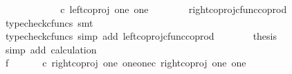 \begin{isabellebody}
\ \ \ \ \isamarkupfalse%
\ \isamarkupfalse%
\ {\isachardoublequoteopen}{\isachardot}{\kern0pt}{\isachardot}{\kern0pt}{\isachardot}{\kern0pt}\ {\isacharequal}{\kern0pt}\ {\isasymlangle}{\isasymt}{\isacharcomma}{\kern0pt}{\isasymf}{\isasymrangle}\ {\isasymamalg}\ {\isasymlangle}{\isasymf}{\isacharcomma}{\kern0pt}{\isasymt}{\isasymrangle}\ {\isasymcirc}\isactrlsub c\ left{\isacharunderscore}{\kern0pt}coproj\ one\ one{\isachardoublequoteclose}\isanewline
\ \ \ \ \ \ \isamarkupfalse%
\ right{\isacharunderscore}{\kern0pt}coproj{\isacharunderscore}{\kern0pt}cfunc{\isacharunderscore}{\kern0pt}coprod\ \isamarkupfalse%
\ {\isacharparenleft}{\kern0pt}typecheck{\isacharunderscore}{\kern0pt}cfuncs{\isacharcomma}{\kern0pt}\ smt{\isacharparenright}{\kern0pt}\isanewline
\ \ \ \ \isamarkupfalse%
\ \isamarkupfalse%
\ {\isachardoublequoteopen}{\isachardot}{\kern0pt}{\isachardot}{\kern0pt}{\isachardot}{\kern0pt}\ {\isacharequal}{\kern0pt}\ {\isasymlangle}{\isasymt}{\isacharcomma}{\kern0pt}{\isasymf}{\isasymrangle}{\isachardoublequoteclose}\isanewline
\ \ \ \ \ \ \isamarkupfalse%
\ {\isacharparenleft}{\kern0pt}typecheck{\isacharunderscore}{\kern0pt}cfuncs{\isacharcomma}{\kern0pt}\ simp\ add{\isacharcolon}{\kern0pt}\ left{\isacharunderscore}{\kern0pt}coproj{\isacharunderscore}{\kern0pt}cfunc{\isacharunderscore}{\kern0pt}coprod{\isacharparenright}{\kern0pt}\isanewline
\ \ \ \ \isamarkupfalse%
\ \isamarkupfalse%
\ {\isacharquery}{\kern0pt}thesis\isanewline
\ \ \ \ \ \ \isamarkupfalse%
\ {\isacharparenleft}{\kern0pt}simp\ add{\isacharcolon}{\kern0pt}\ calculation{\isacharparenright}{\kern0pt}\isanewline
\ \ \isamarkupfalse%
\isanewline
\ \ \isamarkupfalse%
\ f{}{\isacharcolon}{\kern0pt}\ {\isachardoublequoteopen}{\isasymlangle}{\isasymf}{\isacharcomma}{\kern0pt}\ {\isasymf}{\isasymrangle}\ {\isasymamalg}\ {\isasymlangle}{\isasymt}{\isacharcomma}{\kern0pt}{\isasymf}{\isasymrangle}\ {\isasymamalg}\ {\isasymlangle}{\isasymf}{\isacharcomma}{\kern0pt}{\isasymt}{\isasymrangle}\ {\isasymcirc}\isactrlsub c\ {\isacharparenleft}{\kern0pt}right{\isacharunderscore}{\kern0pt}coproj\ one\ {\isacharparenleft}{\kern0pt}one{\isasymCoprod}one{\isacharparenright}{\kern0pt}{\isasymcirc}\isactrlsub c\ right{\isacharunderscore}{\kern0pt}coproj\ one\ one{\isacharparenright}{\kern0pt}\ {\isacharequal}{\kern0pt}\ {\isasymlangle}{\isasymf}{\isacharcomma}{\kern0pt}{\isasymt}{\isasymrangle}{\isachardoublequoteclose}\isanewline

\end{isabellebody}

